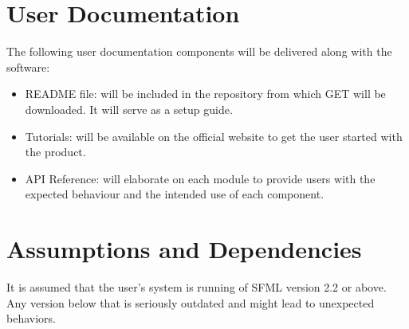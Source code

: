 \documentclass{scrreprt}
\begin{document}

\section{User Documentation}
The following user documentation components will be delivered along with the software:
\begin{itemize}
\item README file: will be included in the repository from which GET will be downloaded. It will serve as a setup guide.
\item Tutorials: will be available on the official website to get the user started with the product.
\item API Reference: will elaborate on each module to provide users with the expected behaviour and the intended use of each component.
\end{itemize}

\section{Assumptions and Dependencies}
It is assumed that the user's system is running of SFML version 2.2 or above. Any version below that is seriously outdated and might lead to unexpected behaviors.
\end{document}
